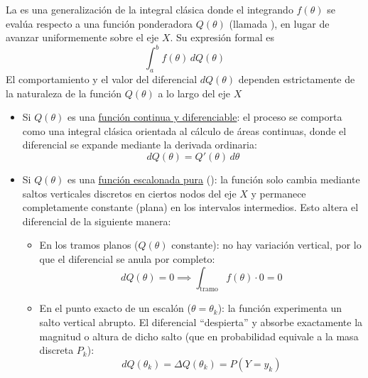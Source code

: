 \begin{definicion}
    La  es una generalización de la integral clásica donde el integrando $f(\theta)$ se evalúa respecto a una función ponderadora $Q(\theta)$ (llamada ), en lugar de avanzar uniformemente sobre el eje $X$. Su expresión formal es
    $$\int_{a}^{b} f(\theta) \, dQ(\theta)$$
    El comportamiento y el valor del diferencial $dQ(\theta)$ dependen estrictamente de la naturaleza de la función $Q(\theta)$ a lo largo del eje $X$
    \begin{itemize}
        \item Si $Q(\theta)$ es una \underline{función continua y diferenciable}: el proceso se comporta como una integral clásica orientada al cálculo de áreas continuas, donde el diferencial se expande mediante la derivada ordinaria:
        $$dQ(\theta) = Q'(\theta) \, d\theta$$
        \item Si $Q(\theta)$ es una \underline{función escalonada pura} (): la función solo cambia mediante saltos verticales discretos en ciertos nodos del eje $X$ y permanece completamente constante (plana) en los intervalos intermedios. Esto altera el diferencial de la siguiente manera:
        \begin{itemize}
            \item En los tramos planos ($Q(\theta)$ constante): no hay variación vertical, por lo que el diferencial se anula por completo:
            $$dQ(\theta) = 0 \implies \int_{\text{tramo}} f(\theta) \cdot 0 = 0$$
            \item En el punto exacto de un escalón ($\theta = \theta_k$): la función experimenta un salto vertical abrupto. El diferencial ``despierta'' y absorbe exactamente la magnitud o altura de dicho salto (que en probabilidad equivale a la masa discreta $P_k$):
            $$dQ(\theta_k) = \Delta Q(\theta_k) = P(Y = y_k)$$
        \end{itemize}
    \end{itemize}
\end{definicion}


